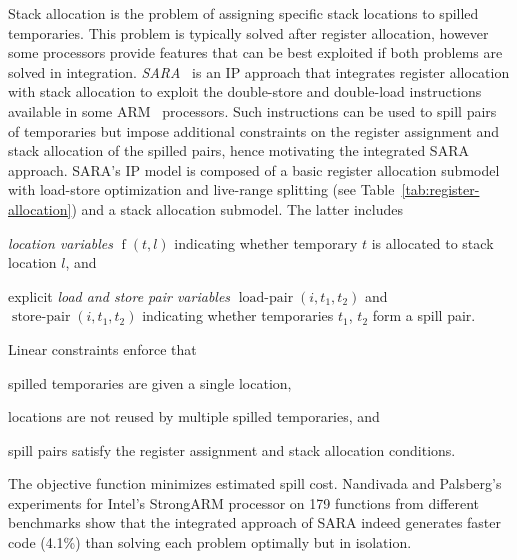 \documentclass[acmsmall,authorversion,nonacm]{acmart}
\newcommand{\noMathVar}[2]{\operatorname{#1}(#2)}
\newcommand{\var}[2]{$\noMathVar{#1}{#2}$}
\begin{document}
Stack allocation is the problem of assigning specific stack locations
to spilled temporaries.
This problem is typically solved after register allocation, however
some processors provide features that can be best exploited if both
problems are solved in integration.
\emph{SARA}~\cite{Nandivada2006} is an IP approach that integrates
register allocation with stack allocation to exploit the double-store
and double-load instructions available in some ARM~\cite{ARM}
processors.
Such instructions can be used to spill pairs of temporaries but impose
additional constraints on the register assignment and stack allocation
of the spilled pairs, hence motivating the integrated SARA approach.
SARA's IP model is composed of a basic register allocation submodel
with load-store optimization and live-range splitting (see
Table~\ref{tab:register-allocation}) and a stack allocation submodel.
The latter includes
\begin{inparaitem}[]
\item \emph{location variables} \var{f}{t,l} indicating whether
  temporary $t$ is allocated to stack location $l$, and
\item explicit \emph{load and store pair variables}
  \var{load-pair}{i,t_1,t_2} and \var{store-pair}{i,t_1,t_2}
  indicating whether temporaries $t_1$, $t_2$ form a spill pair.
\end{inparaitem}
Linear constraints enforce that
\begin{inparaitem}[]
\item spilled temporaries are given a single location,
\item locations are not reused by multiple spilled temporaries, and
\item spill pairs satisfy the register assignment and stack allocation
  conditions.
\end{inparaitem}
The objective function minimizes estimated spill cost.
Nandivada and Palsberg's experiments for Intel's StrongARM processor
on 179 functions from different benchmarks show that the integrated
approach of SARA indeed generates faster code (4.1\%) than solving
each problem optimally but in isolation.
\end{document}
